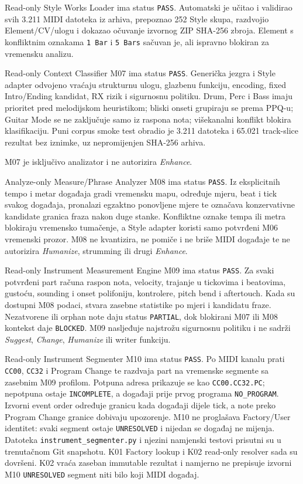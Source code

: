 \documentclass[11pt]{article}
\begin{document}
Read-only Style Works Loader ima status \texttt{PASS}. Automatski je učitao i
validirao svih 3.211 MIDI datoteka iz arhiva, prepoznao 252 Style skupa,
razdvojio Element/CV/ulogu i dokazao očuvanje izvornog ZIP SHA-256 zbroja.
Element  s konfliktnim oznakama \texttt{1 Bar} i
\texttt{5 Bars} sačuvan je, ali ispravno blokiran za vremensku analizu.

Read-only Context Classifier M07 ima status \texttt{PASS}. Generička jezgra i
Style adapter odvojeno vraćaju strukturnu ulogu, glazbenu funkciju, encoding,
fixed Intro/Ending kandidat, RX rizik i sigurnosnu politiku. Drum, Perc i Bass
imaju prioritet pred melodijskom heuristikom; bliski onseti grupiraju se prema
PPQ-u; Guitar Mode se ne zaključuje samo iz raspona nota; višekanalni konflikt
blokira klasifikaciju. Puni corpus smoke test obradio je 3.211 datoteka i
65.021 track-slice rezultat bez iznimke, uz nepromijenjen SHA-256 arhiva.

M07 je isključivo analizator i ne autorizira \emph{Enhance}.

Analyze-only Measure/Phrase Analyzer M08 ima status \texttt{PASS}. Iz
eksplicitnih tempo i metar događaja gradi vremensku mapu, određuje mjeru, beat
i tick svakog događaja, pronalazi egzaktno ponovljene mjere te označava
konzervativne kandidate granica fraza nakon duge stanke. Konfliktne oznake
tempa ili metra blokiraju vremensko tumačenje, a Style adapter koristi samo
potvrđeni M06 vremenski prozor. M08 ne kvantizira, ne pomiče i ne briše MIDI
događaje te ne autorizira \emph{Humanize}, strumming ili drugi \emph{Enhance}.

Read-only Instrument Measurement Engine M09 ima status \texttt{PASS}. Za svaki
potvrđeni part računa raspon nota, velocity, trajanje u tickovima i beatovima,
gustoću, sounding i onset polifoniju, kontrolere, pitch bend i aftertouch. Kada
su dostupni M08 podaci, stvara zasebne statistike po mjeri i kandidatu fraze.
Nezatvorene ili orphan note daju status \texttt{PARTIAL}, dok blokirani M07 ili
M08 kontekst daje \texttt{BLOCKED}. M09 nasljeđuje najstrožu sigurnosnu
politiku i ne sadrži \emph{Suggest}, \emph{Change}, \emph{Humanize} ili writer
funkciju.

Read-only Instrument Segmenter M10 ima status \texttt{PASS}. Po MIDI kanalu
prati \texttt{CC00}, \texttt{CC32} i Program Change te razdvaja part na
vremenske segmente sa zasebnim M09 profilom. Potpuna adresa prikazuje se kao
\texttt{CC00.CC32.PC}; nepotpuna ostaje \texttt{INCOMPLETE}, a događaji prije
prvog programa \texttt{NO\_PROGRAM}. Izvorni event order određuje granicu kada
događaji dijele tick, a note preko Program Change granice dobivaju upozorenje.
M10 ne proglašava Factory/User identitet: svaki segment ostaje
\texttt{UNRESOLVED} i nijedan se događaj ne mijenja. Datoteka
\texttt{instrument\_segmenter.py} i njezini namjenski testovi prisutni su u
trenutačnom Git snapshotu. K01 Factory lookup i K02 read-only resolver sada su
dovršeni. K02 vraća zaseban immutable rezultat i namjerno ne prepisuje izvorni
M10 \texttt{UNRESOLVED} segment niti bilo koji MIDI događaj.
\end{document}

